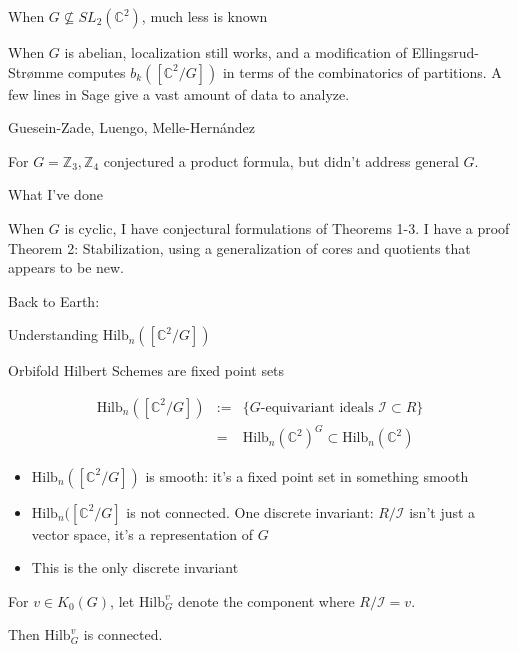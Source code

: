 \documentclass{beamer}
\newcommand{\Hilb}{\textrm{Hilb}}
\newcommand{\C}{\mathbb{C}}
\newcommand{\Z}{\mathbb{Z}}
\begin{document}
\begin{frame}{When $G\nsubseteq SL_2(\C^2)$, much less is known}


When $G$ is abelian, localization still works, and a modification of
Ellingsrud-Str\o mme computes $b_k([\C^2/G])$ in terms of the
combinatorics of partitions.  A few lines in Sage give a vast amount of data to analyze.


\begin{block}{Guesein-Zade, Luengo, Melle-Hern\'andez} 



For $G=\Z_3, \Z_4$ conjectured a product formula, but didn't address general $G$.
\end{block}
\begin{block}{What I've done} 


When $G$ is cyclic, I have conjectural formulations of Theorems 1-3.
I have a proof Theorem 2: Stabilization, using a generalization of cores
and quotients that appears to be new.
\end{block}

\end{frame}


\begin{frame}[plain,c]

\begin{center}

\Huge

Back to Earth:
 
Understanding $\Hilb_n([\C^2/G])$
\end{center}

\end{frame}



\begin{frame}{Orbifold Hilbert Schemes are fixed point sets}


\begin{eqnarray*}
\Hilb_n([\C^2/G])&:=&\{\textrm{$G$-equivariant ideals } \mathcal{I}\subset R\} \\
&=&\Hilb_n(\C^2)^G\subset \Hilb_n(\C^2)
\end{eqnarray*}
\begin{itemize}
\item $\Hilb_n([\C^2/G])$ is smooth: it's a fixed point set in something smooth
\item $\Hilb_n([\C^2/G]$ is not connected.  One discrete invariant: $R/\mathcal{I}$ isn't just a vector space, it's a representation of $G$  
\item This is the only discrete invariant
\end{itemize}

For $v\in K_0(G)$, let $\Hilb^v_G$ denote the component where $R/\mathcal{I}=v$.

Then $\Hilb^v_G$ is connected.
\end{frame}
\end{document}
